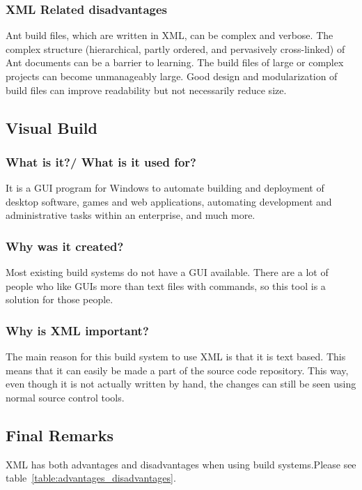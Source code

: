 \subsubsection{XML Related disadvantages}

Ant build files, which are written in XML, can be complex and verbose. The complex structure (hierarchical, partly ordered, and pervasively cross-linked) of Ant documents can be a barrier to learning. The build files of large or complex projects can become unmanageably large. Good design and modularization of build files can improve readability but not necessarily reduce size.

\subsection{Visual Build}
\subsubsection{What is it?/ What is it used for?}

It is a GUI program for Windows to automate building and deployment of desktop software, games and web applications, automating development and administrative tasks within an enterprise, and much more.
\subsubsection{Why was it created?}
Most existing build systems do not have a GUI available. There are a lot of people who like GUIs more than text files with commands, so this tool is a solution for those people.
\subsubsection{Why is XML important?}
The main reason for this build system to use XML is that it is text based. This means that it can easily be made a part of the source code repository. This way, even though it is not actually written by hand, the changes can still be seen using normal source control tools.

\subsection{Final Remarks}

XML has both advantages and disadvantages when using build systems.Please see table~\ref{table:advantages_disadvantages}. 

